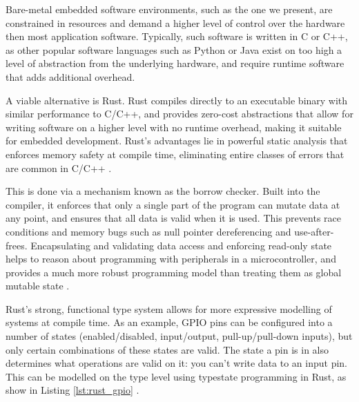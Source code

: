 Bare-metal embedded software environments, such as the one we present, are constrained in resources and demand a higher level of control over the hardware then most application software. Typically, such software is written in C or C++, as other popular software languages such as Python or Java exist on too high a level of abstraction from the underlying hardware, and require runtime software that adds additional overhead.

A viable alternative is Rust. Rust compiles directly to an executable binary with similar performance to C/C++, and provides zero-cost abstractions that allow for writing software on a higher level with no runtime overhead, making it suitable for embedded development. Rust's advantages lie in powerful static analysis that enforces memory safety at compile time, eliminating entire classes of errors that are common in C/C++ \cite{rust-paper}.

This is done via a mechanism known as the borrow checker. Built into the compiler, it enforces that only a single part of the program can mutate data at any point, and ensures that all data is valid when it is used. This prevents race conditions and memory bugs such as null pointer dereferencing and use-after-frees. Encapsulating and validating data access and enforcing read-only state helps to reason about programming with peripherals in a microcontroller, and provides a much more robust programming model than treating them as global mutable state \cite{rust-usability, rust-good}.

Rust's strong, functional type system allows for more expressive modelling of systems at compile time. As an example, GPIO pins can be configured into a number of states (enabled/disabled, input/output, pull-up/pull-down inputs), but only certain combinations of these states are valid. The state a pin is in also determines what operations are valid on it: you can't write data to an input pin. This can be modelled on the type level using typestate programming in Rust, as show in Listing \ref{lst:rust_gpio} \cite{embedded_rust}.

